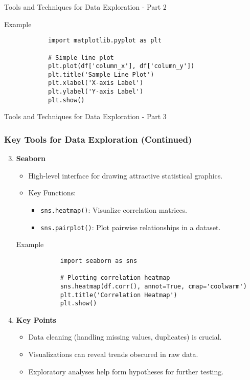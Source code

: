 \documentclass[aspectratio=169]{beamer}
\begin{document}
\begin{frame}[fragile]{Tools and Techniques for Data Exploration - Part 2}
\begin{enumerate}
            \begin{block}{Example}
            \begin{lstlisting}
            import matplotlib.pyplot as plt

            # Simple line plot
            plt.plot(df['column_x'], df['column_y'])
            plt.title('Sample Line Plot')
            plt.xlabel('X-axis Label')
            plt.ylabel('Y-axis Label')
            plt.show()
            \end{lstlisting}
            \end{block}
    \end{enumerate}
\end{frame}

\begin{frame}[fragile]{Tools and Techniques for Data Exploration - Part 3}
    \frametitle{Key Tools for Data Exploration (Continued)}
    \begin{enumerate}
        \setcounter{enumi}{2} %
        \item \textbf{Seaborn}
            \begin{itemize}
                \item High-level interface for drawing attractive statistical graphics.
                \item Key Functions:
                \begin{itemize}
                    \item \texttt{sns.heatmap()}: Visualize correlation matrices.
                    \item \texttt{sns.pairplot()}: Plot pairwise relationships in a dataset.
                \end{itemize}
            \end{itemize}

            \begin{block}{Example}
            \begin{lstlisting}
            import seaborn as sns

            # Plotting correlation heatmap
            sns.heatmap(df.corr(), annot=True, cmap='coolwarm')
            plt.title('Correlation Heatmap')
            plt.show()
            \end{lstlisting}
            \end{block}

        \item \textbf{Key Points}
            \begin{itemize}
                \item Data cleaning (handling missing values, duplicates) is crucial.
                \item Visualizations can reveal trends obscured in raw data.
                \item Exploratory analyses help form hypotheses for further testing.
            \end{itemize}
    \end{enumerate}
    

\end{frame}
\end{document}
